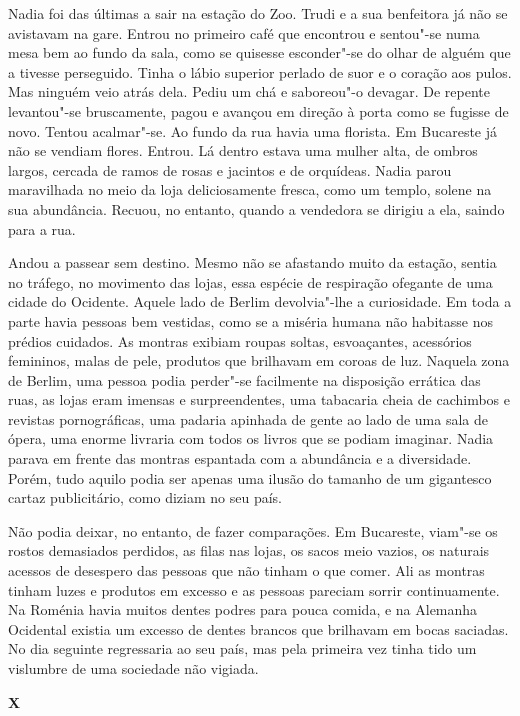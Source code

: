 Nadia foi das últimas a sair na estação do Zoo. Trudi
e a sua benfeitora já não se avistavam na gare. Entrou no primeiro café
que encontrou e sentou"-se numa mesa bem ao fundo da sala, como se
quisesse esconder"-se do olhar de alguém que a tivesse perseguido. Tinha
o lábio superior perlado de suor e o coração aos pulos. Mas ninguém veio
atrás dela. Pediu um chá e saboreou"-o devagar. De repente levantou"-se
bruscamente, pagou e avançou em direção à porta como se fugisse de
novo. Tentou acalmar"-se. Ao fundo da rua havia uma florista. Em
Bucareste já não se vendiam flores. Entrou. Lá dentro estava uma mulher
alta, de ombros largos, cercada de ramos de rosas e jacintos e de
orquídeas. Nadia parou maravilhada no meio da loja deliciosamente
fresca, como um templo, solene na sua abundância. Recuou, no entanto,
quando a vendedora se dirigiu a ela, saindo para a rua.


Andou a passear sem destino. Mesmo não se afastando muito da estação,
sentia no tráfego, no movimento das lojas, essa espécie de respiração
ofegante de uma cidade do Ocidente. Aquele lado de Berlim devolvia"-lhe a
curiosidade. Em toda a parte havia pessoas bem vestidas, como se a
miséria humana não habitasse nos prédios cuidados. As montras exibiam
roupas soltas, esvoaçantes, acessórios femininos, malas de pele,
produtos que brilhavam em coroas de luz. Naquela zona de Berlim, uma
pessoa podia perder"-se facilmente na disposição errática das ruas, as
lojas eram imensas e surpreendentes, uma tabacaria cheia de cachimbos e
revistas pornográficas, uma padaria apinhada de gente ao lado de uma
sala de ópera, uma enorme livraria com todos os livros que se podiam
imaginar. Nadia parava em frente das montras espantada com a
abundância e a diversidade. Porém, tudo aquilo podia ser apenas uma
ilusão do tamanho de um gigantesco cartaz publicitário, como diziam no
seu país.

Não podia deixar, no entanto, de fazer comparações.
Em Bucareste, viam"-se os rostos demasiados perdidos, as filas nas lojas,
os sacos meio vazios, os naturais acessos de desespero das pessoas que
não tinham o que comer. Ali as montras tinham luzes e produtos em
excesso e as pessoas pareciam sorrir continuamente. Na Roménia havia
muitos dentes podres para pouca comida, e na Alemanha Ocidental
existia um excesso de dentes brancos que brilhavam em bocas saciadas.
No dia seguinte regressaria ao seu país, mas pela primeira vez tinha
tido um vislumbre de uma sociedade não vigiada.


\pagebreak
\movetooddpage
\vspace*{1.8cm}
\noindent{}\textbf{X}

